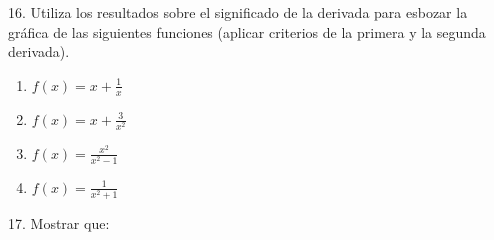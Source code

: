 \documentclass[12pt]{article}
\begin{document}
16. Utiliza los resultados sobre el significado de la derivada para esbozar la gr\'afica de las siguientes funciones (aplicar criterios de la primera y la segunda derivada).

\begin{enumerate}[\hspace{9px} a)]
    \item \(f(x)=x+\displaystyle\frac{1}{x}\)
    \item \(f(x)=x+\displaystyle\frac{3}{x^2}\)
    \item \(f(x)=\displaystyle\frac{x^2}{x^2-1}\)
    \item \(f(x)=\displaystyle\frac{1}{x^2+1}\)
\end{enumerate}

17. Mostrar que:
\end{document}
